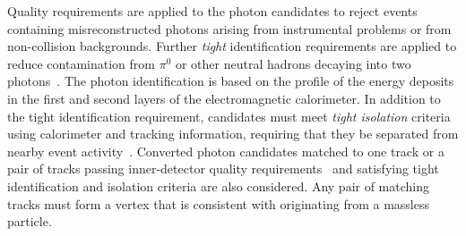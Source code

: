Quality requirements are applied to the photon candidates to reject events containing misreconstructed photons arising from instrumental problems or from non-collision backgrounds.
Further \emph{tight} identification requirements are applied to reduce contamination from $\pi^0$ or other neutral hadrons decaying into two photons~\cite{PERF-2017-02}.
The photon identification is based on the profile of the energy deposits in the first and second layers of the electromagnetic calorimeter.
In addition to the tight identification requirement, candidates must meet \emph{tight isolation} criteria using calorimeter and tracking information, requiring that they be separated from nearby event activity~\cite{PERF-2017-03,HIGG-2016-17}.
Converted photon candidates matched to one track or a pair of tracks passing inner-detector quality requirements~\cite{PERF-2017-02} and satisfying tight identification and isolation criteria are also considered.
Any pair of matching tracks must form a vertex that is consistent with originating from a massless particle.

